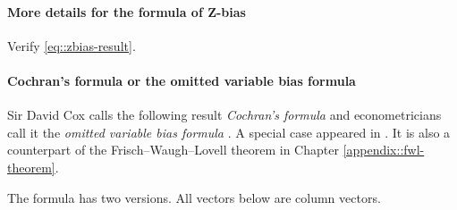 \paragraph{More details for the formula of Z-bias}\label{hw::z-bias-formula}
Verify \eqref{eq::zbias-result}.
 

\paragraph{Cochran's formula or the omitted variable bias formula}
\label{hw::cochran+ovb}



Sir David Cox calls the following result {\it Cochran's formula} \citep{cochran1938omission, cox2007generalization} and econometricians call it the {\it omitted variable bias formula} \citep{angrist2008mostly}. 
A special case appeared in \citet{fisher1925statistical}.
It is also a counterpart of the Frisch--Waugh--Lovell theorem in Chapter \ref{appendix::fwl-theorem}.  

The formula has two versions. All vectors below are column vectors. 

